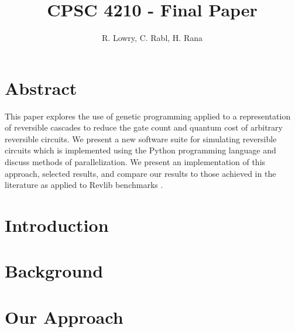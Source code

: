 \documentclass[12pt]{article}
\title{CPSC 4210 - Final Paper}
\author{R. Lowry, C. Rabl, H. Rana}
\date{}
\begin{document}
\maketitle

\section*{Abstract}


This paper explores the use of genetic programming applied to a representation of reversible 
cascades to reduce the gate count and quantum cost of arbitrary reversible circuits. We present 
a new software suite for simulating reversible circuits which is implemented using the Python programming
language and discuss methods of parallelization. We present an implementation of this approach, 
selected results, and compare our results to those achieved in the literature as applied to Revlib 
benchmarks \cite{RevLib}.


\begingroup
\let\clearpage\relax
\section{Introduction}



\section{Background}










\section{Our Approach}







\endgroup

\pagebreak


\end{document}
